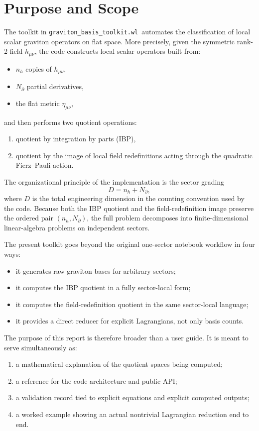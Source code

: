 \documentclass[11pt]{report}
\numberwithin{equation}{chapter}
\newcommand{\toolkit}{\texttt{graviton\_basis\_toolkit.wl}}
\begin{document}
\chapter{Purpose and Scope}

The toolkit in \toolkit\ automates the classification of local scalar graviton operators on flat space.
More precisely, given the symmetric rank-2 field \(h_{\mu\nu}\), the code constructs local scalar operators built from:
\begin{itemize}
\item \(n_h\) copies of \(h_{\mu\nu}\),
\item \(N_\partial\) partial derivatives,
\item the flat metric \(\eta_{\mu\nu}\),
\end{itemize}
and then performs two quotient operations:
\begin{enumerate}[label=\arabic*.]
\item quotient by integration by parts (IBP),
\item quotient by the image of local field redefinitions acting through the quadratic Fierz--Pauli action.
\end{enumerate}

The organizational principle of the implementation is the sector grading
\begin{equation}
  D = n_h + N_\partial,
  \label{eq:total_dimension}
\end{equation}
where \(D\) is the total engineering dimension in the counting convention used by the code.
Because both the IBP quotient and the field-redefinition image preserve the ordered pair \((n_h,N_\partial)\),
the full problem decomposes into finite-dimensional linear-algebra problems on independent sectors.

The present toolkit goes beyond the original one-sector notebook workflow in four ways:
\begin{itemize}
\item it generates raw graviton bases for arbitrary sectors;
\item it computes the IBP quotient in a fully sector-local form;
\item it computes the field-redefinition quotient in the same sector-local language;
\item it provides a direct reducer for explicit Lagrangians, not only basis counts.
\end{itemize}

The purpose of this report is therefore broader than a user guide.
It is meant to serve simultaneously as:
\begin{enumerate}[label=\alph*.]
\item a mathematical explanation of the quotient spaces being computed;
\item a reference for the code architecture and public API;
\item a validation record tied to explicit equations and explicit computed outputs;
\item a worked example showing an actual nontrivial Lagrangian reduction end to end.
\end{enumerate}
\end{document}
